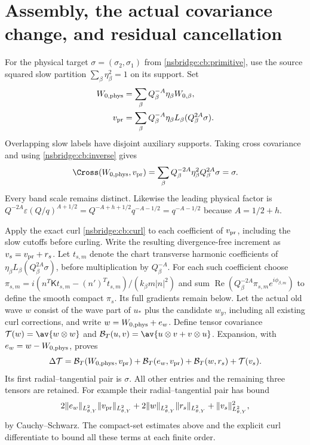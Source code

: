 \section{Assembly, the actual covariance change, and residual cancellation}
For the physical target $\sigma=(\sigma_2,\sigma_1)$ from
\eqref{nsbridge:cb:primitive}, use the source squared slow partition
$\sum_\beta\eta_\beta^2=1$ on its support. Set
\begin{align}
 W_{0,\rm phys}&=\sum_\beta Q_\beta^{-A}\eta_\beta W_{0,\beta},\nonumber\\
 v_{\rm pr}&=\sum_\beta Q_\beta^{-A}\eta_\beta
                        L_\beta(Q_\beta^{2A}\sigma).
 \label{nsbridge:cb:assembly}
\end{align}
Overlapping slow labels have disjoint auxiliary supports. Taking cross
covariance and using \eqref{nsbridge:cb:inverse} gives
\[
 \Cross(W_{0,\rm phys},v_{\rm pr})
 =\sum_\beta Q_\beta^{-2A}\eta_\beta^2Q_\beta^{2A}\sigma=\sigma.
\]
Every band scale remains distinct. Likewise the leading physical factor is
$Q^{-2A}\varepsilon(Q/q)^{A+1/2}
=Q^{-A+h+1/2}q^{-A-1/2}=q^{-A-1/2}$ because $A=1/2+h$.

Apply the exact curl \eqref{nsbridge:cb:curl} to each coefficient of
$v_{\rm pr}$, including the slow cutoffs before curling. Write the
resulting divergence-free increment as $v_s=v_{\rm pr}+r_s$.
Let $t_{s,m}$ denote the chart transverse harmonic coefficients of
$\eta_\beta L_\beta(Q_\beta^{2A}\sigma)$, before multiplication by
$Q_\beta^{-A}$. For each such coefficient choose
$\pi_{s,m}=i(n^T\mathsf Kt_{s,m}-(n')^Tt_{s,m})/
(k_\beta m|n|^2)$ and sum
$\operatorname{Re}(Q_\beta^{-2A}\pi_{s,m}e^{i\phi_{\beta,m}})$
to define the smooth compact $\pi_s$. Its full gradients remain below.
Let the actual old wave $w$ consist of the wave part of $u_*$
plus the candidate $w_y$, including all existing curl corrections, and write
$w=W_{0,\rm phys}+e_w$. Define tensor covariance
$\mathcal T(w)=\av{w\otimes w}$ and
$\mathcal B_T(u,v)=\av{u\otimes v+v\otimes u}$.
Expansion, with $e_w=w-W_{0,\rm phys}$, proves
\begin{equation}
 \Delta\mathcal T=
 \mathcal B_T(W_{0,\rm phys},v_{\rm pr})
 +\mathcal B_T(e_w,v_{\rm pr})
 +\mathcal B_T(w,r_s)+\mathcal T(v_s).
 \label{nsbridge:cb:fullcov}
\end{equation}
Its first radial--tangential pair is $\sigma$.
All other entries and the remaining three tensors are retained.
For example their radial--tangential pair has bound
\[
 2\|e_w\|_{L^2_{\theta,Y}}\|v_{\rm pr}\|_{L^2_{\theta,Y}}
 +2\|w\|_{L^2_{\theta,Y}}\|r_s\|_{L^2_{\theta,Y}}
 +\|v_s\|_{L^2_{\theta,Y}}^2 ,
\]
by Cauchy--Schwarz. The compact-set estimates above and the explicit
curl differentiate to bound all these terms at each finite order.

